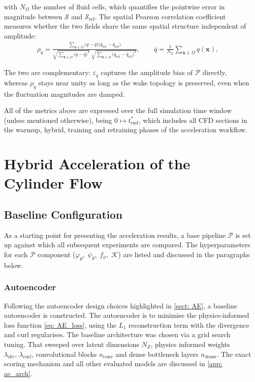 with $N_\Omega$ the number of fluid cells, which quantifies the pointwise error in magnitude between $\mathcal{S}$ and $\mathcal{S}_\text{ref}$. The spatial Pearson correlation coefficient measures whether the two fields share the same spatial structure independent of amplitude:
\begin{align}
\rho_q
  = \frac{\sum_{\mathbf{x}\in\Omega}
           \bigl(q - \bar{q}\bigr)
           \bigl(q_\text{ref} - \bar{q}_\text{ref}\bigr)}
         {\sqrt{\sum_{\mathbf{x}\in\Omega}\bigl(q - \bar{q}\bigr)^2}\;
          \sqrt{\sum_{\mathbf{x}\in\Omega}
                \bigl(q_\text{ref} - \bar{q}_\text{ref}\bigr)^2}},
\qquad
\bar{q} = \frac{1}{N_\Omega}\sum_{\mathbf{x}\in\Omega} q(\mathbf{x}),
\end{align}
     
The two are complementary: $\varepsilon_q$ captures the amplitude bias of $\mathcal{P}$ directly, whereas $\rho_q$ stays near unity as long as the wake topology is preserved, even when the fluctuation magnitudes are damped.


All of the metrics above are expressed over the full simulation time window (unless mentioned otherwise), being $0 \mapsto t^*_\text{end}$, which includes all CFD sections in the warmup, hybrid, training and retraining phases of the acceleration workflow. 

\section{Hybrid Acceleration of the Cylinder Flow}
\label{sect: 4_base_hybrid}

\subsection{Baseline Configuration}
\label{subsect: 4_baseline}
As a starting point for presenting the acceleration results, a base pipeline $\mathcal{P}$ is set up against which all subsequent experiments are compared. The hyperparameters for each $\mathcal{P}$ component ($\varphi_\theta, \; \psi_\theta, \; f_\phi, \; \mathcal{K}$) are listed and discussed in the paragraphs below.

\subsubsection{Autoencoder}
Following the autoencoder design choices highlighted in \ref{sect: AE}, a baseline autoencoder is constructed. The autoencoder is to minimise the physics-informed loss function \ref{eq: AE_loss}, using the $L_1$ reconstruction term with the divergence and curl regularises. The baseline architecture was chosen via a grid search tuning. That sweeped over latent dimensions $N_Z$, physics informed weights $\lambda_\text{div},\,\lambda_\text{curl}$, convolutional blocks $n_\text{conv}$ and dense bottleneck layers $n_\text{dense}$. The exact scoring mechanism and all other evaluated models are discussed in \ref{app: ae_arch}. 

